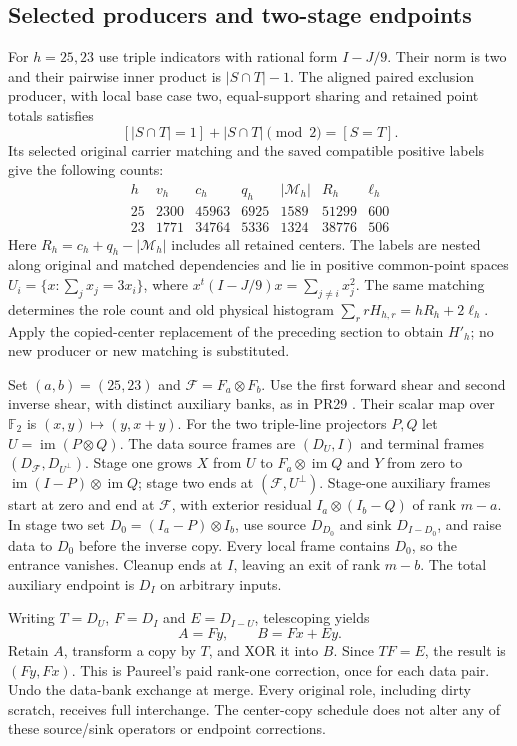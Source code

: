 \subsection{Selected producers and two-stage endpoints}
For $h=25,23$ use triple indicators with rational form $I-J/9$.
Their norm is two and their pairwise inner product is $|S\cap T|-1$.
The aligned paired exclusion producer, with local base case two,
equal-support sharing and retained point totals satisfies
\[
 [|S\cap T|=1]+|S\cap T|\pmod2=[S=T].
\]
Its selected original carrier matching and the saved compatible positive
labels give the following counts:
\[
\begin{array}{c|rrrrrr}
h&v_h&c_h&q_h&|\mathcal M_h|&R_h&\ell_h\\\hline
25&2300&45963&6925&1589&51299&600\\
23&1771&34764&5336&1324&38776&506
\end{array}
\]
Here $R_h=c_h+q_h-|\mathcal M_h|$ includes all retained centers.
The labels are nested along original and matched dependencies and lie
in positive common-point spaces
$U_i=\{x:\sum_jx_j=3x_i\}$, where
$x^t(I-J/9)x=\sum_{j\ne i}x_j^2$. The same matching determines the
role count and old physical histogram $\sum_r rH_{h,r}=hR_h+2\ell_h$.
Apply the copied-center replacement of the preceding section to obtain
$H'_h$; no new producer or new matching is substituted.

Set $(a,b)=(25,23)$ and $\mathcal F=F_a\otimes F_b$.
Use the first forward shear and second inverse shear, with distinct
auxiliary banks, as in PR29 \cite{pr29}. Their scalar map over
$\mathbb F_2$ is $(x,y)\mapsto(y,x+y)$. For the two triple-line
projectors $P,Q$ let $U=\operatorname{im}(P\otimes Q)$.
The data source frames are $(D_U,I)$ and terminal frames
$(D_{\mathcal F},D_{U^\perp})$.
Stage one grows $X$ from $U$ to $F_a\otimes\operatorname{im}Q$
and $Y$ from zero to $\operatorname{im}(I-P)\otimes\operatorname{im}Q$;
stage two ends at $(\mathcal F,U^\perp)$.
Stage-one auxiliary frames start at zero and end at $\mathcal F$,
with exterior residual $I_a\otimes(I_b-Q)$ of rank $m-a$.
In stage two set $D_0=(I_a-P)\otimes I_b$, use source $D_{D_0}$
and sink $D_{I-D_0}$, and raise data to $D_0$ before the inverse copy.
Every local frame contains $D_0$, so the entrance vanishes. Cleanup
ends at $I$, leaving an exit of rank $m-b$. The total auxiliary endpoint
is $D_I$ on arbitrary inputs.

Writing $T=D_U$, $F=D_I$ and $E=D_{I-U}$, telescoping yields
\[
 A=Fy,\qquad B=Fx+Ey.
\]
Retain $A$, transform a copy by $T$, and XOR it into $B$.
Since $TF=E$, the result is $(Fy,Fx)$. This is Paureel's paid
rank-one correction, once for each data pair. Undo the data-bank exchange
at merge. Every original role, including dirty scratch, receives full
interchange. The center-copy schedule does not alter any of these
source/sink operators or endpoint corrections.

